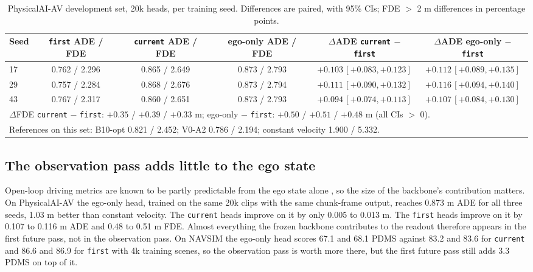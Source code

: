 \documentclass[10pt]{article}
\newcommand{\first}{\texttt{first}}
\newcommand{\current}{\texttt{current}}
\newcommand{\VA}[2]{V#1-A#2}
\begin{document}
\begin{table}[t]
\caption{PhysicalAI-AV development set, 20k heads, per training seed. Differences are paired, with 95\% CIs; FDE $>$ 2 m differences in percentage points.}
\label{tab:phase20k}
\begin{center}
\footnotesize
\setlength{\tabcolsep}{2.5pt}
\begin{tabular}{lccccc}
\toprule
Seed & \first{} ADE / FDE & \current{} ADE / FDE & ego-only ADE / FDE & $\Delta$ADE \current{} $-$ \first{} & $\Delta$ADE ego-only $-$ \first{} \\
\midrule
17 & 0.762 / 2.296 & 0.865 / 2.649 & 0.873 / 2.793 & $+0.103\,[+0.083,+0.123]$ & $+0.112\,[+0.089,+0.135]$ \\
29 & 0.757 / 2.284 & 0.868 / 2.676 & 0.873 / 2.794 & $+0.111\,[+0.090,+0.132]$ & $+0.116\,[+0.094,+0.140]$ \\
43 & 0.767 / 2.317 & 0.860 / 2.651 & 0.873 / 2.793 & $+0.094\,[+0.074,+0.113]$ & $+0.107\,[+0.084,+0.130]$ \\
\midrule
\multicolumn{6}{l}{$\Delta$FDE \current{} $-$ \first{}: $+0.35$ / $+0.39$ / $+0.33$ m; ego-only $-$ \first{}: $+0.50$ / $+0.51$ / $+0.48$ m (all CIs $>$ 0).} \\
\multicolumn{6}{l}{References on this set: B10-opt 0.821 / 2.452; \VA{0}{2} 0.786 / 2.194; constant velocity 1.900 / 5.332.} \\
\bottomrule
\end{tabular}
\end{center}
\end{table}

\subsection{The observation pass adds little to the ego state}
\label{sec:egoonly}

Open-loop driving metrics are known to be partly predictable from the ego state alone \citep{zhai2023admlp,li2024egostatus}, so the size of the backbone's contribution matters. On PhysicalAI-AV the ego-only head, trained on the same 20k clips with the same chunk-frame output, reaches 0.873 m ADE for all three seeds, 1.03 m better than constant velocity. The \current{} heads improve on it by only 0.005 to 0.013 m. The \first{} heads improve on it by 0.107 to 0.116 m ADE and 0.48 to 0.51 m FDE. Almost everything the frozen backbone contributes to the readout therefore appears in the first future pass, not in the observation pass. On NAVSIM the ego-only head scores 67.1 and 68.1 PDMS against 83.2 and 83.6 for \current{} and 86.6 and 86.9 for \first{} with 4k training scenes, so the observation pass is worth more there, but the first future pass still adds 3.3 PDMS on top of it.
\end{document}
